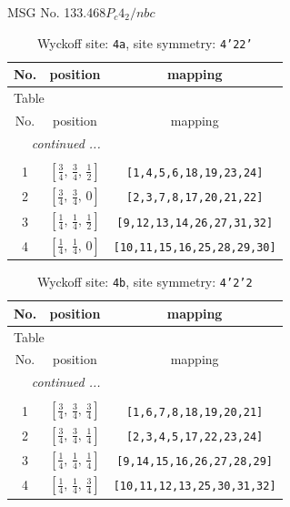 \documentclass[fleqn,8pt]{jsarticle}
\begin{document}
\setcounter{MaxMatrixCols}{32}

\renewcommand{\tablename}{Table~}
\renewcommand{\figurename}{Figure~}
\begin{center}
\LARGE
MSG No. 133.468\quad$P_{c}4_{2}/nbc$
\end{center}
\renewcommand{\arraystretch}{1.2}
\begin{longtable}{ccc}
\caption{Wyckoff site: {\tt 4a}, site symmetry: {\tt 4'22'}}
 \\
 \hline \hline
No. & position & mapping \\ \hline \endfirsthead

\multicolumn{2}{l}{\tablename\ \thetable{}} \\
 \hline \hline
No. & position & mapping \\ \hline \endhead

 \hline \hline
\multicolumn{2}{r}{\footnotesize\it continued ...} \\ \endfoot

 \hline \hline
\multicolumn{2}{r}{} \\ \endlastfoot

1 & $\left[ \frac{3}{4},\, \frac{3}{4},\, \frac{1}{2} \right]$ & {\tt [1,4,5,6,18,19,23,24]} \\ \hline
2 & $\left[ \frac{3}{4},\, \frac{3}{4},\, 0 \right]$ & {\tt [2,3,7,8,17,20,21,22]} \\ \hline
3 & $\left[ \frac{1}{4},\, \frac{1}{4},\, \frac{1}{2} \right]$ & {\tt [9,12,13,14,26,27,31,32]} \\ \hline
4 & $\left[ \frac{1}{4},\, \frac{1}{4},\, 0 \right]$ & {\tt [10,11,15,16,25,28,29,30]} \\
\end{longtable}
\renewcommand{\arraystretch}{1.2}
\begin{longtable}{ccc}
\caption{Wyckoff site: {\tt 4b}, site symmetry: {\tt 4'2'2}}
 \\
 \hline \hline
No. & position & mapping \\ \hline \endfirsthead

\multicolumn{2}{l}{\tablename\ \thetable{}} \\
 \hline \hline
No. & position & mapping \\ \hline \endhead

 \hline \hline
\multicolumn{2}{r}{\footnotesize\it continued ...} \\ \endfoot

 \hline \hline
\multicolumn{2}{r}{} \\ \endlastfoot

1 & $\left[ \frac{3}{4},\, \frac{3}{4},\, \frac{3}{4} \right]$ & {\tt [1,6,7,8,18,19,20,21]} \\ \hline
2 & $\left[ \frac{3}{4},\, \frac{3}{4},\, \frac{1}{4} \right]$ & {\tt [2,3,4,5,17,22,23,24]} \\ \hline
3 & $\left[ \frac{1}{4},\, \frac{1}{4},\, \frac{1}{4} \right]$ & {\tt [9,14,15,16,26,27,28,29]} \\ \hline
4 & $\left[ \frac{1}{4},\, \frac{1}{4},\, \frac{3}{4} \right]$ & {\tt [10,11,12,13,25,30,31,32]} \\
\end{longtable}
\end{document}
